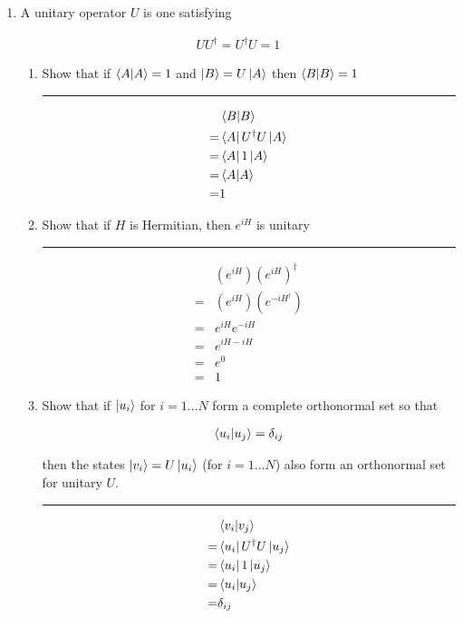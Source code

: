 \documentclass[12pt, oneside]{article}
\newenvironment{answer}
  {\vspace*{0.2cm} \rule{12cm}{0.02cm} \vspace*{0.2cm}}
  {\vspace*{0.2cm}}
\begin{document}
\begin{enumerate}
  \item A unitary operator $U$ is one satisfying

  \begin{align*}
    UU^\dagger = U^\dagger U = 1
  \end{align*}

  \begin{enumerate}
    \item Show that if $\bra{A}\ket{A} = 1$ and $\ket{B} = U \ket{A}$ then $\bra{B}\ket{B} = 1$

    \begin{answer}
      \begin{align*}
          &\bra{B}\ket{B}\\
        = &\bra{A}U^\dagger U\ket{A}\\
        = &\bra{A}1\ket{A}\\
        = &\bra{A}\ket{A}\\
        = &1
      \end{align*}
    \end{answer}

    \item Show that if $H$ is Hermitian, then $e^{iH}$ is unitary

    \begin{answer}
      \begin{align*}
          &(e^{iH})(e^{iH})^\dagger \\
        = &(e^{iH})(e^{-iH^\dagger}) \\
        = &e^{iH}e^{-iH} \\
        = &e^{iH-iH} \\
        = &e^{0} \\
        = &1
      \end{align*}
    \end{answer}

    \item Show that if $\ket{u_i}$ for $i=1 \dots N$ form a complete orthonormal set so that

    \begin{align*}
      \bra{u_i}\ket{u_j} = \delta_{ij}
    \end{align*}

    then the states $\ket{v_i} = U\ket{u_i}$ (for $i=1 \dots N$) also form an orthonormal set for unitary $U$.

    \begin{answer}
      \begin{align*}
          &\bra{v_i}\ket{v_j}\\
        = &\bra{u_i}U^\dagger U\ket{u_j}\\
        = &\bra{u_i}1\ket{u_j}\\
        = &\bra{u_i}\ket{u_j}\\
        = &\delta_{ij}
      \end{align*}
    \end{answer}
  \end{enumerate}


\end{enumerate}
\end{document}
